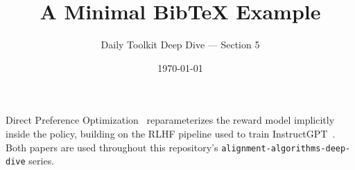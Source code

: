 \documentclass[11pt]{article}
\title{A Minimal BibTeX Example}
\author{Daily Toolkit Deep Dive --- Section 5}
\date{\today}
\begin{document}
\maketitle

Direct Preference Optimization~\cite{rafailov2023dpo} reparameterizes
the reward model implicitly inside the policy, building on the RLHF
pipeline used to train InstructGPT~\cite{ouyang2022instructgpt}. Both
papers are used throughout this repository's
\texttt{alignment-algorithms-deep-dive} series.



\end{document}
